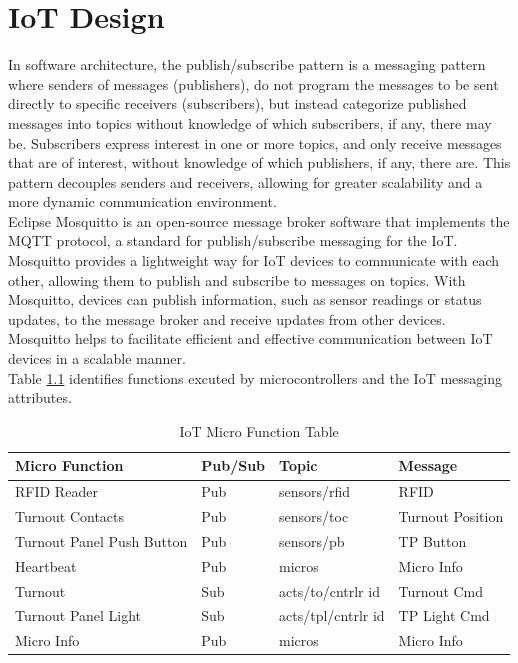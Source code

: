 \chapter{IoT Design}

In software architecture, the publish/subscribe pattern is a messaging pattern where senders of messages (publishers), do not program the messages to be sent directly to specific receivers (subscribers), but instead categorize published messages into topics without knowledge of which subscribers, if any, there may be. Subscribers express interest in one or more topics, and only receive messages that are of interest, without knowledge of which publishers, if any, there are. This pattern decouples senders and receivers, allowing for greater scalability and a more dynamic communication environment.\vspace{5mm} \\
Eclipse Mosquitto is an open-source message broker software that implements the \ac{MQTT} protocol, a standard for publish/subscribe messaging for the \ac{IoT}. Mosquitto provides a lightweight way for IoT devices to communicate with each other, allowing them to publish and subscribe to messages on topics. With Mosquitto, devices can publish information, such as sensor readings or status updates, to the message broker and receive updates from other devices. Mosquitto helps to facilitate efficient and effective communication between \ac{IoT} devices in a scalable manner.\vspace{5mm} \\
Table \ref{iot-table} identifies functions excuted by microcontrollers and the \ac{IoT} messaging attributes.\vspace{5mm} \\

\begin{table}[!ht]
    \begin{center}
    \begin{tabular}{|l|l|l|l|}
    \hline
        \textbf{Micro Function} & \textbf{Pub/Sub} & \textbf{Topic} & \textbf{Message} \\ \hline
        RFID Reader & Pub & sensors/rfid & RFID \\ \hline
        Turnout Contacts & Pub & sensors/toc & Turnout Position\\ \hline
        Turnout Panel Push Button & Pub & sensors/pb & TP Button \\ \hline
        Heartbeat & Pub & micros & Micro Info\\ \hline
        Turnout & Sub & acts/to/cntrlr id &  Turnout Cmd\\ \hline
        Turnout Panel Light & Sub & acts/tpl/cntrlr id & TP Light Cmd\\ \hline
        Micro Info & Pub & micros & Micro Info\\ \hline
    \end{tabular}
    \caption{\label{iot-table}IoT Micro Function Table}
    \end{center}
\end{table}


